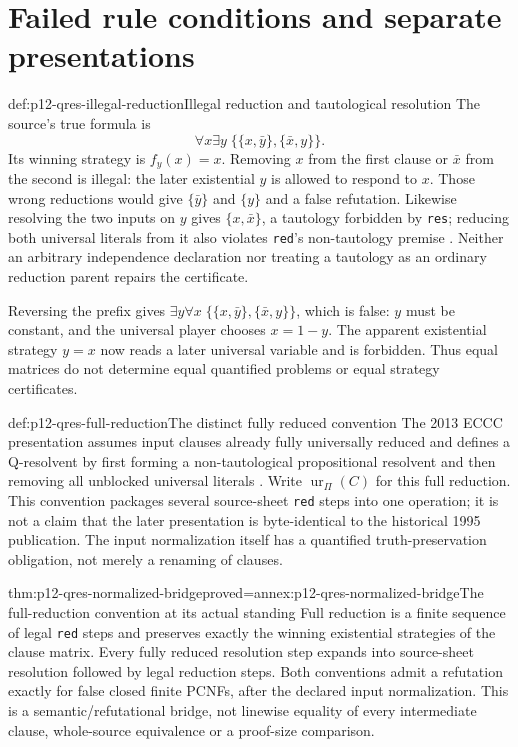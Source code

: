 \section{Failed rule conditions and separate presentations}

\begin{hbexample}{def:p12-qres-illegal-reduction}{Illegal reduction and tautological resolution}
The source's true formula is
\[
 \forall x\exists y\;\{\{x,\bar y\},\{\bar x,y\}\}.
\]
Its winning strategy is \(f_y(x)=x\).  Removing \(x\) from the first
clause or \(\bar x\) from the second is illegal: the later existential
\(y\) is allowed to respond to \(x\).  Those wrong reductions would give
\(\{\bar y\}\) and \(\{y\}\) and a false refutation.  Likewise resolving
the two inputs on \(y\) gives \(\{x,\bar x\}\), a tautology forbidden
by \texttt{res}; reducing both universal literals from it also violates
\texttt{red}'s non-tautology premise
\cite[Example~2.3.2]{BeyersdorffEtAl2021QBFJulyAuthor}.
Neither an arbitrary independence declaration nor treating a tautology as an
ordinary reduction parent repairs the certificate.
\end{hbexample}

Reversing the prefix gives
\(\exists y\forall x\;\{\{x,\bar y\},\{\bar x,y\}\}\), which is
false: \(y\) must be constant, and the universal player chooses
\(x=1-y\).  The apparent existential strategy \(y=x\) now reads a later
universal variable and is forbidden.  Thus equal matrices do not determine
equal quantified problems or equal strategy certificates.

\begin{hbdefinition}{def:p12-qres-full-reduction}{The distinct fully reduced convention}
The 2013 ECCC presentation assumes input clauses already fully universally
reduced and defines a Q-resolvent by first forming a non-tautological
propositional resolvent and then removing all unblocked universal literals
\cite[Preliminaries, p.~2]{JanotaMarquesSilva2013QBFExpansionECCC97}.
Write \(\operatorname{ur}_{\Pi}(C)\) for this full reduction.  This convention
packages several source-sheet \texttt{red} steps into one operation; it is
not a claim that the later presentation is byte-identical to the
historical 1995 publication. The input normalization itself has a quantified
truth-preservation obligation, not merely a renaming of clauses.
\end{hbdefinition}

\begin{hbtheorem}{thm:p12-qres-normalized-bridge}{proved=annex:p12-qres-normalized-bridge}{The full-reduction convention at its actual standing}
Full reduction is a finite sequence of legal \texttt{red} steps and preserves
exactly the winning existential strategies of the clause matrix.  Every
fully reduced resolution step expands into source-sheet resolution followed
by legal reduction steps.  Both conventions admit a refutation exactly for
false closed finite PCNFs, after the declared input normalization.  This is
a semantic/refutational bridge, not linewise equality of every intermediate
clause, whole-source equivalence or a proof-size comparison.
\end{hbtheorem}

